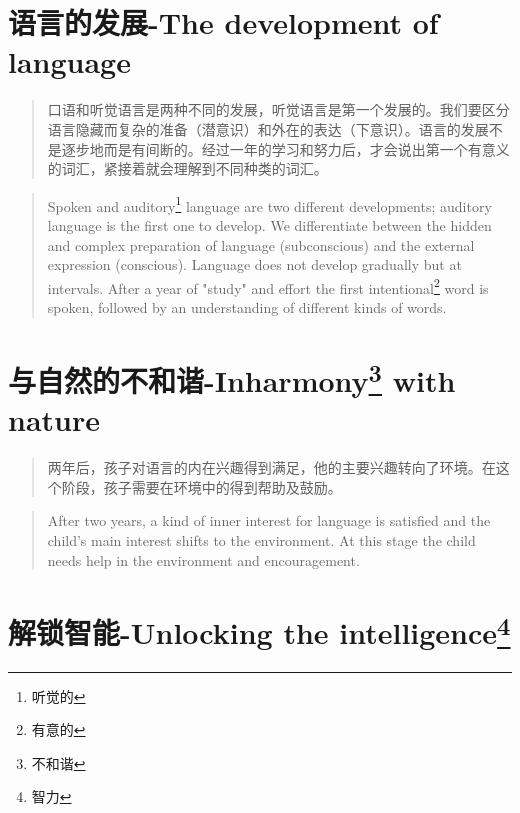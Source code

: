\documentclass[lang=cn,10pt]{elegantbook}
\begin{document}
\chapter{语言的发展-The development of language}

\begin{quote}
{\small 口语和听觉语言是两种不同的发展，听觉语言是第一个发展的。我们要区分语言隐藏而复杂的准备（潜意识）和外在的表达（下意识）。语言的发展不是逐步地而是有间断的。经过一年的学习和努力后，才会说出第一个有意义的词汇，紧接着就会理解到不同种类的词汇。}
\end{quote}

\begin{tcolorbox}
\begin{quote}
{\small Spoken and auditory\footnote{听觉的} language are two different developments; auditory language is the first one to develop. We differentiate between the hidden and complex preparation of language (subconscious) and the external expression (conscious). Language does not develop gradually but at intervals. After a year of "study" and effort the first intentional\footnote{有意的} word is spoken, followed by an understanding of different kinds of words.}
\end{quote}
\end{tcolorbox}

\chapter{与自然的不和谐-Inharmony\footnote{不和谐} with nature}

\begin{quote}
{\small 两年后，孩子对语言的内在兴趣得到满足，他的主要兴趣转向了环境。在这个阶段，孩子需要在环境中的得到帮助及鼓励。}
\end{quote}

\begin{tcolorbox}
\begin{quote}
{\small After two years, a kind of inner interest for language is satisfied and the child's main interest shifts to the environment. At this stage the child needs help in the environment and encouragement.}
\end{quote}
\end{tcolorbox}

\chapter{解锁智能-Unlocking the intelligence\footnote{智力}}
\end{document}
